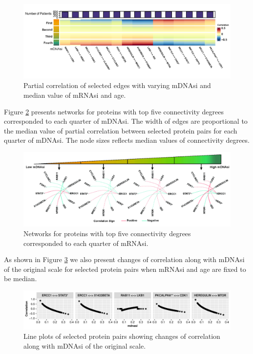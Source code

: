 \documentclass[
]{book}
\begin{document}
\begin{figure}

{\centering \includegraphics[width=0.9\linewidth]{images/mdna_cor} 

}

\caption{Partial correlation of selected edges with varying mDNAsi and median value of mRNAsi and age.}\label{fig:mdnasicor}
\end{figure}

Figure \ref{fig:mdnasinet} presents networks for proteins with top five connectivity degrees corresponded to each quarter of mDNAsi. The width of edges are proportional to the median value of partial correlation between selected protein pairs for each quarter of mDNAsi. The node sizes reflects median values of connectivity degrees.

\begin{figure}

{\centering \includegraphics[width=0.9\linewidth]{images/mdna_network} 

}

\caption{Networks for proteins with top five connectivity degrees corresponded to each quarter of mRNAsi.}\label{fig:mdnasinet}
\end{figure}

As shown in Figure \ref{fig:mdnasiline} we also present changes of correlation along with mDNAsi of the original scale for selected protein pairs when mRNAsi and age are fixed to be median.

\begin{figure}

{\centering \includegraphics[width=0.9\linewidth]{images/dna_line} 

}

\caption{Line plots of selected protein pairs showing changes of correlation along with mDNAsi of the original scale.}\label{fig:mdnasiline}
\end{figure}
\end{document}
